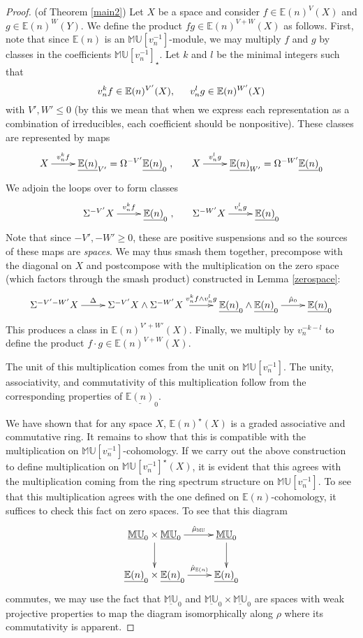 \documentclass[12pt]{amsart}
\numberwithin{equation}{section}
\theoremstyle{plain}  %
\theoremstyle{definition}  %
\newcommand{\ind}{\hspace{15 pt}}
\newcommand{\MU}{\mathbb {MU}}
\newcommand{\E}{\mathbb{E}}
\renewcommand{\sp}[2]{\underline{#1}_{#2}}
\begin{document}
\begin{proof}(of Theorem \ref{main2}) Let $X$ be a space and consider $f \in \E(n)^V(X)$ and $g \in \E(n)^W(Y)$. We define the product $fg
\in \E(n)^{V+W}(X)$ as follows. First, note that since $\E(n)$ is an $\MU[v_n^{-1}]$-module, we may multiply $f$ and $g$ by classes in the coefficients $\MU[v_n^{-1}]_\star$. Let $k$ and $l$ be the minimal integers such that
$$v_n^kf \in \E(n)^{V'}(X), \ind v_n^lg \in \E(n)^{W'}(X)$$
with $V', W' \leq 0$ (by this we mean that when we express each representation as a combination of irreducibles, each coefficient should be nonpositive). These classes are represented by maps
$$\xymatrix{X \ar@{->}[r]^-{v_n^kf} & \underline{\E(n)}_{V'} = \Omega^{-V'}\underline{\E(n)}_0},
 \ind \xymatrix{X \ar@{->}[r]^-{v_n^lg} & \underline{\E(n)}_{W'} = \Omega^{-W'}\underline{\E(n)}_0}$$
We adjoin the loops over to form classes
$$\xymatrix{\Sigma^{-V'}X \ar@{->}[r]^-{v_n^kf} & \underline{\E(n)}_0}, \ind \xymatrix{\Sigma^{-W'}X \ar@{->}[r]^-{v_n^lg} & \underline{\E(n)}_0}$$
Note that since $-V', -W' \geq 0$, these are positive suspensions and so the sources of these maps are \emph{spaces}. We may thus smash them together, precompose with the diagonal on $X$ and postcompose with the multiplication on the zero space (which factors through the smash product) constructed in Lemma \ref{zerospace}:
$$\xymatrix{\Sigma^{-V'-W'}X \ar@{->}[r]^-{\Delta} & \Sigma^{-V'} X \wedge \Sigma^{-W'}X \, \, \ar@{->}[r]^-{v_n^kf \wedge v_n^lg} & \, \, \underline{\E(n)}_0 \wedge \underline{\E(n)}_0 \ar@{->}[r]^-{\hat{\mu}_0} & \underline{\E(n)}_0}$$
This produces a class in $\E(n)^{V'+W'}(X)$. Finally, we multiply by $v_n^{-k-l}$ to define the product $f\cdot g \in \E(n)^{V+W}(X)$.

\medskip
\noindent
The unit of this multiplication comes from the unit on $\MU[v_n^{-1}]$. The unity, associativity, and commutativity of this multiplication follow from the corresponding properties of $\underline{\E(n)}_0$.

\medskip
\noindent
We have shown that for any space $X$, $\E(n)^\star(X)$ is a graded associative and commutative ring. It remains to show that this is compatible with the multiplication on $\MU[v_n^{-1}]$-cohomology. If we carry out the above construction to define multiplication on $\MU[v_n^{-1}]^\star(X)$, it is evident that this agrees with the multiplication coming from the ring spectrum structure on $\MU[v_n^{-1}]$. To see that this multiplication agrees with the one defined on $\E(n)$-cohomology, it suffices to check this fact on zero spaces. To see that this diagram
$$\xymatrix{\sp{\MU}{0} \times \underline{\MU}_0 \ar@{->}[r]^-{\hat{\mu}_{\MU}} \ar@{->}[d] & \underline{\MU}_0 \ar@{->}[d] \\
\underline{\E(n)}_0 \times \underline{\E(n)}_0 \ar@{->}[r]^-{\hat{\mu}_{\E(n)}} & \underline{\E(n)}_0}$$
commutes, we may use the fact that $\underline{\MU}_0$ and $\underline{\MU}_0 \times \underline{\MU}_0$ are spaces with weak projective properties to map the diagram isomorphically along $\rho$ where its commutativity is apparent.
\end{proof}
\end{document}
